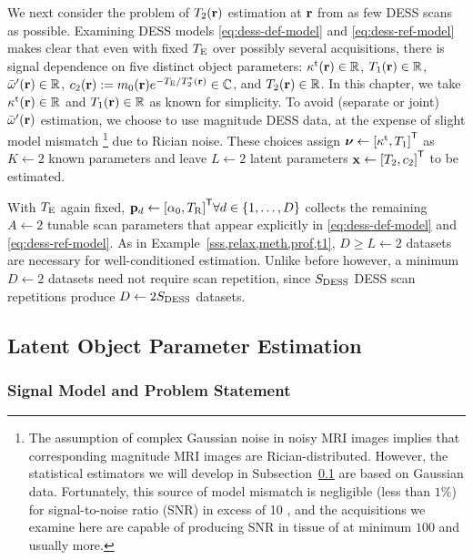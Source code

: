 We next consider 
the problem of $\Tt\pr$ estimation at $\mathbf{r}$
from as few DESS scans as possible.
Examining DESS models 
\eqref{eq:dess-def-model} and \eqref{eq:dess-ref-model}
makes clear that even with fixed $T_\mathrm{E}$
over possibly several acquisitions, 
there is signal dependence 
on five distinct object parameters:
$\stx\pr \in \real$,
$\To\pr \in \real$, 
$\ompmed\pr \in \real$,
$\const{2}\pr := \mzero\pr e^{-\TE/\Tts\pr} \in \complex$, 
and $\Tt\pr \in \real$.
In this chapter,
we take $\stx\pr \in \real$ and $\To\pr \in \real$
as known for simplicity.
To avoid (separate or joint) $\ompmed\pr$ estimation,
we choose to use magnitude DESS data,
at the expense of slight model mismatch
\footnote{The assumption of complex Gaussian noise 
in noisy MRI images
implies that corresponding magnitude MRI images
are Rician-distributed.
However,
the statistical estimators
we will develop
in Subsection~\ref{ss,relax,meth,est}
are based on Gaussian data.
Fortunately,
this source of model mismatch
is negligible (less than $1\%$)
for signal-to-noise ratio (SNR)
in excess of 10 \cite{gudbjartsson:95:trd},
and the acquisitions we examine here
are capable of producing SNR in tissue 
of at minimum $100$ and usually more. 
}
due to Rician noise.
These choices assign 
$\bmnu \gets \brac{\stx, \To}\tpose$ 
as $K \gets 2$
known parameters
and leave $L \gets 2$
latent parameters  
$\bmx \gets \brac{\Tt, \const{2}}\tpose$
to be estimated.

With $T_\mathrm{E}$ again fixed, 
$\bmp_d \gets \brac{\flipnom, \TR}\tpose
\forall d \in \set{1,\dots,D}$
collects the remaining $A \gets 2$ 
tunable scan parameters
that appear explicitly in
\eqref{eq:dess-def-model} and \eqref{eq:dess-ref-model}.
As in Example~\ref{sss,relax,meth,prof,t1},
$D \geq L \gets 2$ datasets are necessary
for well-conditioned estimation.
Unlike before however,
a minimum $D \gets 2$ datasets 
need not require scan repetition,
since $S_{\mathrm{DESS}}$ DESS scan repetitions
produce $D \gets 2S_{\mathrm{DESS}}$ datasets.

\subsection{Latent Object Parameter Estimation}
\label{ss,relax,meth,est}

\subsubsection{Signal Model and Problem Statement}
\label{sss,relax,meth,est,sig}

